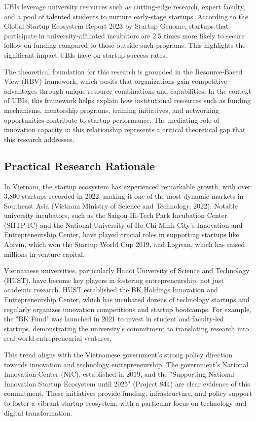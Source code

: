 \documentclass[../Main.tex]{subfiles}
\begin{document}
	UBIs leverage university resources such as cutting-edge research, expert faculty, and a pool of talented students to nurture early-stage startups. According to the Global Startup Ecosystem Report 2023 by Startup Genome, startups that participate in university-affiliated incubators are 2.5 times more likely to secure follow-on funding compared to those outside such programs. This highlights the significant impact UBIs have on startup success rates.

	The theoretical foundation for this research is grounded in the Resource-Based View (RBV) framework, which posits that organizations gain competitive advantages through unique resource combinations and capabilities. In the context of UBIs, this framework helps explain how institutional resources such as funding mechanisms, mentorship programs, training initiatives, and networking opportunities contribute to startup performance. The mediating role of innovation capacity in this relationship represents a critical theoretical gap that this research addresses.

	\subsection{Practical Research Rationale}
	\label{subsection:1.1.2_Practical_research_rationale}
	In Vietnam, the startup ecosystem has experienced remarkable growth, with over 3,800 startups recorded in 2022, making it one of the most dynamic markets in Southeast Asia (Vietnam Ministry of Science and Technology, 2022). Notable university incubators, such as the Saigon Hi-Tech Park Incubation Center (SHTP-IC) and the National University of Ho Chi Minh City's Innovation and Entrepreneurship Center, have played crucial roles in supporting startups like Abivin, which won the Startup World Cup 2019, and Logivan, which has raised millions in venture capital.

	Vietnamese universities, particularly Hanoi University of Science and Technology (HUST), have become key players in fostering entrepreneurship, not just academic research. HUST established the BK Holdings Innovation and Entrepreneurship Center, which has incubated dozens of technology startups and regularly organizes innovation competitions and startup bootcamps. For example, the "BK Fund" was launched in 2021 to invest in student and faculty-led startups, demonstrating the university's commitment to translating research into real-world entrepreneurial ventures.

	This trend aligns with the Vietnamese government's strong policy direction towards innovation and technology entrepreneurship. The government's National Innovation Center (NIC), established in 2019, and the "Supporting National Innovation Startup Ecosystem until 2025" (Project 844) are clear evidence of this commitment. These initiatives provide funding, infrastructure, and policy support to foster a vibrant startup ecosystem, with a particular focus on technology and digital transformation.
\end{document}
